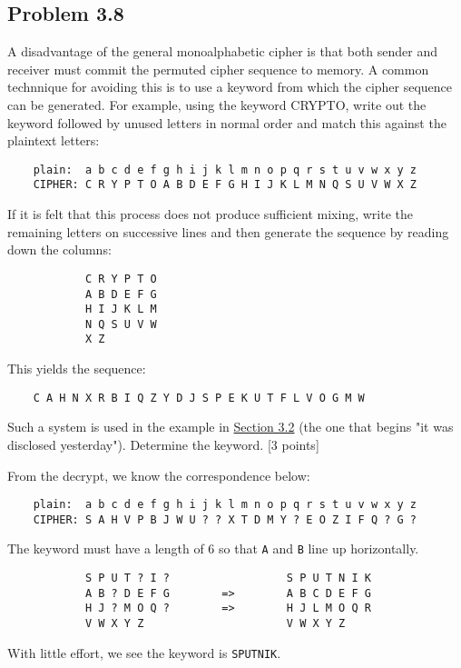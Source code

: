 \documentclass[../hw_sols.tex]{subfiles}
\begin{document}
\subsection*{Problem 3.8}
A disadvantage of the general monoalphabetic cipher is that both sender and receiver must commit the permuted cipher sequence to memory. A common technnique for avoiding this is to use a keyword from which the cipher sequence can be generated. For example, using the keyword CRYPTO, write out the keyword followed by unused letters in normal order and match this against the plaintext letters:
\begin{verbatim}
    plain:  a b c d e f g h i j k l m n o p q r s t u v w x y z
    CIPHER: C R Y P T O A B D E F G H I J K L M N Q S U V W X Z
\end{verbatim}

\noindent If it is felt that this process does not produce sufficient mixing, write the remaining letters on successive lines and then generate the sequence by reading down the columns:
\begin{verbatim}
            C R Y P T O
            A B D E F G
            H I J K L M
            N Q S U V W
            X Z
\end{verbatim}

\noindent This yields the sequence:
\begin{verbatim}
    C A H N X R B I Q Z Y D J S P E K U T F L V O G M W
\end{verbatim}

\noindent Such a system is used in the example in \href{run:../Cryptography and Network Security.pdf}{Section 3.2} (the one that begins "it was disclosed yesterday"). Determine the keyword. [3 points]

\begin{solution}
From the decrypt, we know the correspondence below:
\begin{verbatim}
    plain:  a b c d e f g h i j k l m n o p q r s t u v w x y z
    CIPHER: S A H V P B J W U ? ? X T D M Y ? E O Z I F Q ? G ?	
\end{verbatim}

\noindent The keyword must have a length of 6 so that \verb|A| and \verb|B| line up horizontally.
\begin{verbatim}
            S P U T ? I ?                  S P U T N I K
            A B ? D E F G        =>        A B C D E F G
            H J ? M O Q ?        =>        H J L M O Q R
            V W X Y Z                      V W X Y Z
\end{verbatim}

\noindent With little effort, we see the keyword is \verb|SPUTNIK|.
\end{solution}
\end{document}
